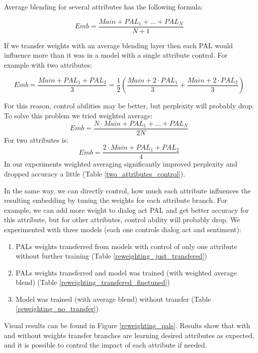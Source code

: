 \documentclass[11pt]{article}
\begin{document}
Average blending for several attributes has the following formula:

\begin{equation}
Emb = \frac{Main + PAL_1 + \dots + PAL_N}{N + 1}
\end{equation}

If we transfer weights with an average blending layer then each PAL would influence more than it was in a model with a single attribute control. For example with two attributes:

\begin{equation}
    Emb = \frac{Main + PAL_1 + PAL_2}{3} = \frac{1}{2}\left(\frac{Main + 2 \cdot PAL_1}{3} + \frac{Main + 2 \cdot PAL_2}{3}\right)
\end{equation}

For this reason, control abilities may be better, but perplexity will probably drop. To solve this problem we tried weighted average:
\begin{equation}
    Emb = \frac{N \cdot Main + PAL_1 + \dots + PAL_N}{2N}
\end{equation}
For two attributes is:
\begin{equation}
    Emb = \frac{2 \cdot Main + PAL_1 + PAL_2}{4}
\end{equation}
In our experiments weighted averaging significantly improved perplexity and dropped accuracy a little (Table \ref{two_attributes_control}). 

In the same way, we can directly control, how much each attribute influences the resulting embedding by tuning the weights for each attribute branch. For example, we can add more weight to dialog act PAL and get better accuracy for this attribute, but for other attributes, control ability will probably drop. We experimented with three models (each one controls dialog act and sentiment):
\begin{enumerate}
    \item PALs weights transferred from models with control of only one attribute without further training (Table \ref{reweighting_just_transfered})
    \item PALs weights transferred and model was trained (with weighted average blend) (Table \ref{reweighting_transfered_finetuned})
    \item Model was trained (with average blend) without transfer (Table \ref{reweighting_no_transfer})
\end{enumerate}

Visual results can be found in Figure \ref{reweighting_pals}. Results show that with and without weights transfer branches are learning desired attributes as expected, and it is possible to control the impact of each attribute if needed.
\end{document}
